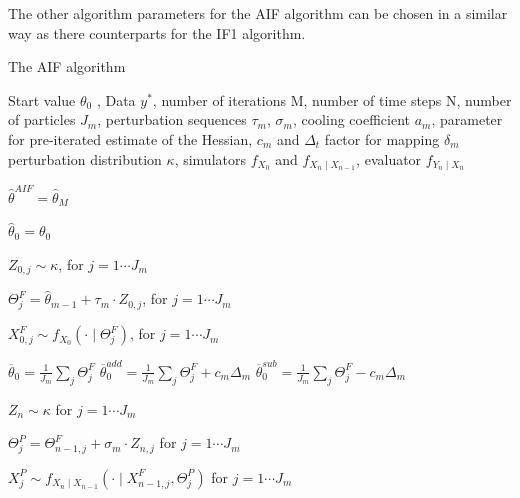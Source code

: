 \documentclass[twoside,openright]{report}
\begin{document}
The other algorithm parameters for the AIF algorithm can be chosen in a similar way as there counterparts for the IF1 algorithm. 

\begin{algorithm}[]
  \caption{The AIF algorithm }\label{alg:AIF_pseudo_code}
  \begin{algorithmic}
    
    \Require Start value $\theta_0$ , Data $y^{*}$, number of iterations M, number of time steps N,  number of particles $J_m$, perturbation sequences $\tau_m$, $\sigma_m$, cooling coefficient $a_m$, parameter for pre-iterated estimate of the Hessian, $c_m$ and $\Delta_t$ factor for mapping $\delta_m$  perturbation distribution $\kappa$, simulators $f_{X_0}$ and $f_{X_n \mid X_{n-1}}$, evaluator $f_{Y_n \mid X_n}$
    
    \Ensure $\hat{\theta}^{AIF} = \hat{\theta}_M$ 
    
    \State $\hat{\theta}_0 = \theta_0$
    
        
        \State $Z_{0,j} \sim \kappa$, for $j = 1 \cdots J_m$  
        
        \State $\Theta^{F}_j = \hat{\theta}_{m-1} + \tau_{m} \cdot Z_{0,j}$, for $j = 1 \cdots J_m$  
        
        \State $X^{F}_{0,j} \sim f_{X_0}( \cdot \mid \Theta^{F}_j)$, for $j = 1 \cdots J_m$  
        
        \State $\overline{\theta}_0 = \frac{1}{J_m} \sum_{j} \Theta^F_j$  
        \State $\overline{\theta}_{0}^{add} = \frac{1}{J_m} \sum_{j} \Theta^F_j + c_m \Delta_m$ 
        \State $\overline{\theta}_{0}^{sub} = \frac{1}{J_m} \sum_{j} \Theta^F_j - c_m \Delta_m$ 
            
            \State $Z_n \sim \kappa$ for $j = 1 \cdots J_m$ 
            
            \State $\Theta^{P}_j = \Theta^{F}_{n-1,j} + \sigma_m \cdot Z_{n,j}$ for $j = 1 \cdots J_m$ 
            
            \State $X^{P}_{j} \sim f_{X_n \mid X_{n-1}}(\cdot \mid  X^F_{n-1,j}, \Theta^{P}_j )$ for $j = 1 \cdots J_m$ 
            

\end{algorithmic}
\end{algorithm}
\end{document}
